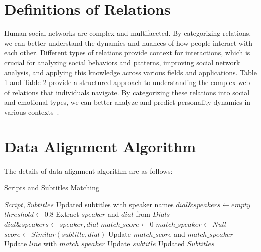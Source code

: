 \documentclass[letterpaper]{article} %
\begin{document}
\section{Definitions of Relations}
\label{sec:appendixB}
Human social networks are complex and multifaceted. By categorizing relations, we can better understand the dynamics and nuances of how people interact with each other. Different types of relations provide context for interactions, which is crucial for analyzing social behaviors and patterns, improving social network analysis, and applying this knowledge across various fields and applications.
Table 1 and Table 2 provide a structured approach to understanding the complex web of relations that individuals navigate. By categorizing these relations into social and emotional types, we can better analyze and predict personality dynamics in various contexts~\citep{Collins_Sroufe_1999, 10.1093/acprof:oso/9780195150100.001.0001}. 



\section{Data Alignment Algorithm}
\label{sec:appendixC}
The details of data alignment algorithm are as follows:
\begin{algorithm}[!h]
	\small
	\caption{Scripts and Subtitles Matching}
	\label{alg:Matching}
	\renewcommand{\algorithmicrequire}{\textbf{Input:}}
	\renewcommand{\algorithmicensure}{\textbf{Output:}}
	
	\begin{algorithmic}[1]
		\REQUIRE $Script, Subtitles$
		\ENSURE Updated subtitles with speaker names
		\STATE $dial \& speakers \gets empty$
		\STATE $threshold \gets 0.8$
		\STATE Extract $speaker$ and $dial$ from $Dials$
		\STATE $dial \& speakers \gets speaker, dial$ 
		\ENDFOR
		\ENDFOR
		\STATE $match\_score \gets 0$
		\STATE $match\_speaker \gets Null$
		\STATE $score \gets Similar(subtitle, dial)$
		\STATE Update $match\_score$ and $match\_speaker$
		\ENDIF
		\ENDFOR
		\STATE Update $line$ with $match\_speaker$
		\ENDIF
		\ENDFOR
		\STATE Update $subtitle$
		\ENDFOR
		\RETURN Updated $Subtitles$
	\end{algorithmic}
\end{algorithm}
\end{document}
